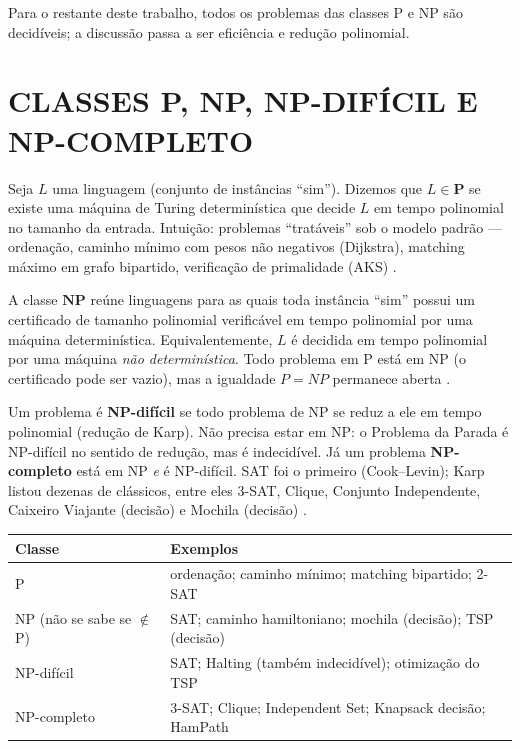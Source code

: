 \documentclass[
    12pt,
    oneside,
    a4paper,
    chapter=TITLE,
    section=TITLE,
    sumario=abnt-6027-2012
]{abntex2}
\begin{document}
Para o restante deste trabalho, todos os problemas das classes P e NP são decidíveis; a discussão passa a ser eficiência e redução polinomial.

\chapter{CLASSES P, NP, NP-DIFÍCIL E NP-COMPLETO}
\label{cap:classes}

Seja $L$ uma linguagem (conjunto de instâncias ``sim''). Dizemos que $L \in \mathbf{P}$ se existe uma máquina de Turing determinística que decide $L$ em tempo polinomial no tamanho da entrada. Intuição: problemas ``tratáveis'' sob o modelo padrão --- ordenação, caminho mínimo com pesos não negativos (Dijkstra), matching máximo em grafo bipartido, verificação de primalidade (AKS) \cite{sipser,cormen}.

A classe $\mathbf{NP}$ reúne linguagens para as quais toda instância ``sim'' possui um certificado de tamanho polinomial verificável em tempo polinomial por uma máquina determinística. Equivalentemente, $L$ é decidida em tempo polinomial por uma máquina \textit{não determinística}. Todo problema em P está em NP (o certificado pode ser vazio), mas a igualdade $P=NP$ permanece aberta \cite{garey,papadimitriou}.

Um problema é \textbf{NP-difícil} se todo problema de NP se reduz a ele em tempo polinomial (redução de Karp). Não precisa estar em NP: o Problema da Parada é NP-difícil no sentido de redução, mas é indecidível. Já um problema \textbf{NP-completo} está em NP \textit{e} é NP-difícil. SAT foi o primeiro (Cook--Levin); Karp listou dezenas de clássicos, entre eles 3-SAT, Clique, Conjunto Independente, Caixeiro Viajante (decisão) e Mochila (decisão) \cite{karp,garey}.

\begin{quadro}[!h]
    \centering
    \small
    \begin{tabular}{|p{3.0cm}|p{9.2cm}|}
        \hline
        \textbf{Classe} & \textbf{Exemplos} \\
        \hline
        P & ordenação; caminho mínimo; matching bipartido; 2-SAT \\
        \hline
        NP (não se sabe se $\notin$ P) & SAT; caminho hamiltoniano; mochila (decisão); TSP (decisão) \\
        \hline
        NP-difícil & SAT; Halting (também indecidível); otimização do TSP \\
        \hline
        NP-completo & 3-SAT; Clique; Independent Set; Knapsack decisão; HamPath \\
        \hline
    \end{tabular}
\end{quadro}
\end{document}
